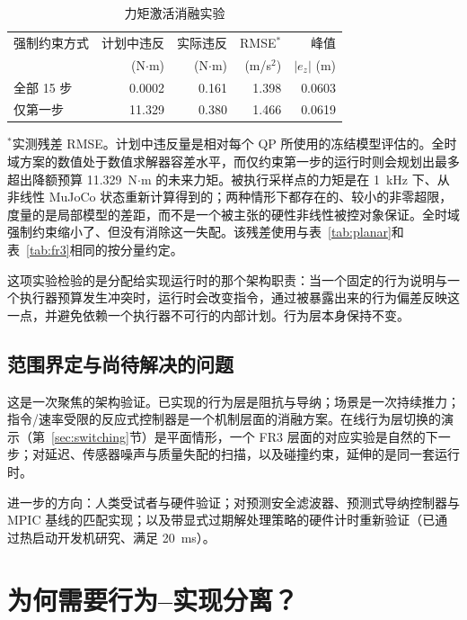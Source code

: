 \documentclass[journal]{IEEEtran}
\begin{document}
\begin{table}[t]
\centering
\caption{力矩激活消融实验}
\label{tab:torque}
\small
\begin{tabular}{@{}lrrrr@{}}
\toprule
强制约束方式 & 计划中违反 & 实际违反 & RMSE$^{*}$ & 峰值 \\
& (N$\cdot$m) & (N$\cdot$m) & (m/s$^2$) & $|e_z|$ (m) \\
\midrule
全部 15 步 & 0.0002 & 0.161 & 1.398 & 0.0603 \\
仅第一步 & 11.329 & 0.380 & 1.466 & 0.0619 \\
\bottomrule
\end{tabular}

\vspace{2pt}
\raggedright\footnotesize
$^{*}$实测残差 RMSE。计划中违反量是相对每个 QP 所使用的冻结模型评估的。全时域方案的数值处于数值求解器容差水平，而仅约束第一步的运行时则会规划出最多超出降额预算 11.329~N$\cdot$m 的未来力矩。被执行采样点的力矩是在 1~kHz 下、从非线性 MuJoCo 状态重新计算得到的；两种情形下都存在的、较小的非零超限，度量的是局部模型的差距，而不是一个被主张的硬性非线性被控对象保证。全时域强制约束缩小了、但没有消除这一失配。该残差使用与表~\ref{tab:planar}和表~\ref{tab:fr3}相同的按分量约定。
\end{table}

这项实验检验的是分配给实现运行时的那个架构职责：当一个固定的行为说明与一个执行器预算发生冲突时，运行时会改变指令，通过被暴露出来的行为偏差反映这一点，并避免依赖一个执行器不可行的内部计划。行为层本身保持不变。

\subsection{范围界定与尚待解决的问题}
\label{sec:scope}

这是一次聚焦的架构验证。已实现的行为层是阻抗与导纳；场景是一次持续推力；指令/速率受限的反应式控制器是一个机制层面的消融方案。在线行为层切换的演示（第~\ref{sec:switching}节）是平面情形，一个 FR3 层面的对应实验是自然的下一步；对延迟、传感器噪声与质量失配的扫描，以及碰撞约束，延伸的是同一套运行时。

进一步的方向：人类受试者与硬件验证；对预测安全滤波器、预测式导纳控制器与 MPIC 基线的匹配实现；以及带显式过期解处理策略的硬件计时重新验证（已通过热启动开发机研究、满足 20~ms）。

\section{为何需要行为--实现分离？}
\label{sec:why}
\end{document}
